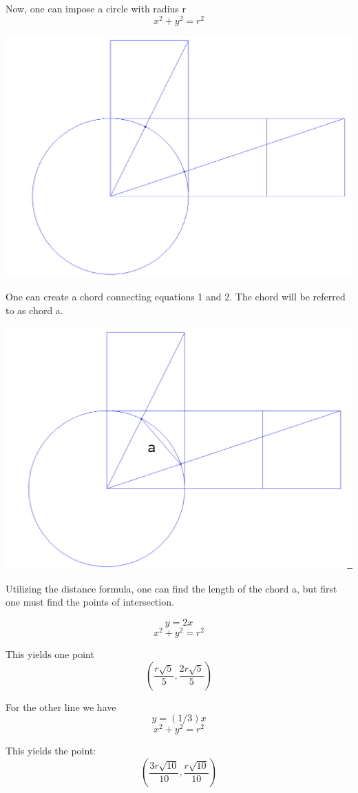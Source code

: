 \documentclass{article}
\begin{document}
Now, one can impose a circle with radius r $$x^2+y^2=r^2$$
\begin{center}
	\includegraphics[width=.8\linewidth]{circle.png}
\end{center}

\pagebreak
One can create a chord connecting equations 1 and 2. The chord will be referred to as chord a. 
\begin{center}
	\includegraphics[width=.8\linewidth]{chord.png}
\end{center}

 Utilizing the distance formula, one can find the length of the chord a, but first one must find the points of intersection. 
 
$$ y=2x $$
$$ x^2+y^2=r^2 $$

This yields one point $$(\frac{ r\sqrt{5} }{5}, \frac{ 2r\sqrt{5} }{5})$$

For the other line we have
$$ y=(1/3)x $$
$$ x^2+y^2=r^2 $$



This yields the point: $$(\frac{3r\sqrt{10}}{10}, \frac{r\sqrt{10}}{10})$$
\end{document}
